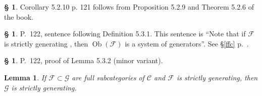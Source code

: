 \documentclass[12pt]{article}%
\newtheorem{lem}[thm]{Lemma}
\theoremstyle{remark}
\theoremstyle{definition}
\newtheorem{s}[thm]{\S}%
\newcommand{\cc}{\mathcal}
\newcommand{\C}{\mathcal C}
\newcommand{\F}{\mathcal F}
\newcommand{\G}{\mathcal G}
\DeclareMathOperator{\Ob}{Ob}
\begin{document}
%

\begin{s}
Corollary 5.2.10 p. 121 follows from Proposition 5.2.9 and Theorem 5.2.6 of the book.
\end{s}

%

\begin{s}
P.~122, sentence following Definition 5.3.1. This sentence is ``Note that if $\cc F$ is strictly generating , then $\Ob(\cc F)$ is a system of generators''. See \S\ref{ffc} p.~\pageref{ffc}.
\end{s}

%

\begin{s} 
P.~122, proof of Lemma 5.3.2 (minor variant). 

\begin{lem} 
If $\F\subset\G$ are full subcategories of $\C$ and $\F$ is strictly generating, then $\G$ is strictly generating. 
\end{lem} 


\end{s}
\end{document}
